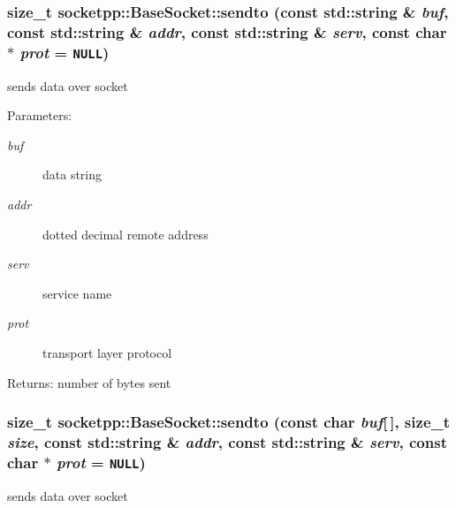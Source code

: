 \begin{CompactItemize}
{\subsubsection[{sendto}]{\setlength{\rightskip}{0pt plus 5cm}size\_\-t socketpp::BaseSocket::sendto (const std::string \& {\em buf}, \/  const std::string \& {\em addr}, \/  const std::string \& {\em serv}, \/  const char $\ast$ {\em prot} = {\tt NULL})}}
\label{classsocketpp_1_1BaseSocket_5fd9737270ee71d2292e70ed625d63f9}


sends data over socket 

\begin{Desc}
\item[Parameters:]
\begin{description}
\item[{\em buf}]data string \item[{\em addr}]dotted decimal remote address \item[{\em serv}]service name \item[{\em prot}]transport layer protocol \end{description}
\end{Desc}
\begin{Desc}
\item[Returns:]number of bytes sent \end{Desc}
\hypertarget{classsocketpp_1_1BaseSocket_c0bbca9725a55a2e6a822536efd31b73}{
\subsubsection[{sendto}]{\setlength{\rightskip}{0pt plus 5cm}size\_\-t socketpp::BaseSocket::sendto (const char {\em buf}\mbox{[}$\,$\mbox{]}, \/  size\_\-t {\em size}, \/  const std::string \& {\em addr}, \/  const std::string \& {\em serv}, \/  const char $\ast$ {\em prot} = {\tt NULL})}}
\label{classsocketpp_1_1BaseSocket_c0bbca9725a55a2e6a822536efd31b73}


sends data over socket 


\end{CompactItemize}
